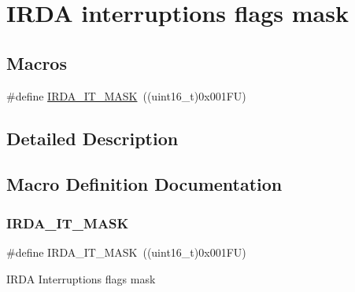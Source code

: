 \hypertarget{group___i_r_d_a___interruption___mask}{}\section{I\+R\+DA interruptions flags mask}
\label{group___i_r_d_a___interruption___mask}
\subsection*{Macros}
\begin{DoxyCompactItemize}
\item 
\#define \hyperlink{group___i_r_d_a___interruption___mask_ga38eeb904e4117f70c18bf3767c7ba4a6}{I\+R\+D\+A\+\_\+\+I\+T\+\_\+\+M\+A\+SK}~((uint16\+\_\+t)0x001\+F\+U)
\end{DoxyCompactItemize}


\subsection{Detailed Description}


\subsection{Macro Definition Documentation}
\mbox{\label{group___i_r_d_a___interruption___mask_ga38eeb904e4117f70c18bf3767c7ba4a6}} 
\subsubsection{\texorpdfstring{I\+R\+D\+A\+\_\+\+I\+T\+\_\+\+M\+A\+SK}{IRDA\_IT\_MASK}}
{\footnotesize\ttfamily \#define I\+R\+D\+A\+\_\+\+I\+T\+\_\+\+M\+A\+SK~((uint16\+\_\+t)0x001\+F\+U)}

I\+R\+DA Interruptions flags mask 
